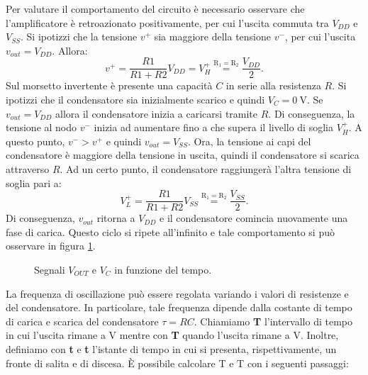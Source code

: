 \noindent
Per valutare il comportamento del circuito è necessario osservare che l'amplificatore è retroazionato positivamente, per cui l'uscita commuta tra $V_{DD}$ e $V_{SS}$. Si ipotizzi che la tensione $v^+$ sia maggiore della tensione $v^-$, per cui l'uscita $v_{out} = V_{DD}$. Allora:
\begin{equation}
	v^+ = \frac{R1}{R1+R2} V_{DD} = V_H^+\overset{\mathrm{R_1=R_2}}{=}\frac{V_{DD}}{2}.
\end{equation}
Sul morsetto invertente è presente una capacità $C$ in serie alla resistenza $R$. Si ipotizzi che il condensatore sia inizialmente scarico e quindi $V_C = \SI{0}{\volt}$. Se $v_{out} = V_{DD}$ allora il condensatore inizia a caricarsi tramite $R$. Di conseguenza, la tensione al nodo $v^-$ inizia ad aumentare fino a che supera il livello di soglia $V_H^+$. A questo punto, $v^- > v^+$ e quindi $v_{out} = V_{SS}$. Ora, la tensione ai capi del condensatore è maggiore della tensione in uscita, quindi il condensatore si scarica attraverso $R$. Ad un certo punto, il condensatore raggiungerà l'altra tensione di soglia pari a:
\begin{equation}
	V_L^+ = \frac{R1}{R1+R2} V_{SS}\overset{\mathrm{R_1=R_2}}{=}\frac{V_{SS}}{2}.
\end{equation}
Di conseguenza, $v_{out}$ ritorna a $V_{DD}$ e il condensatore comincia nuovamente una fase di carica. Questo ciclo si ripete all'infinito e tale comportamento si può osservare in figura \ref{fig:oscillatore}.

\begin{figure}[h!]
	\centering
	\caption{Segnali $V_{OUT}$ e $V_C$ in funzione del tempo.}
	\label{fig:oscillatore}
\end{figure}



La frequenza di oscillazione può essere regolata variando i valori di resistenze e del condensatore. In particolare, tale frequenza dipende dalla costante di tempo di carica e scarica del condensatore $\tau=RC$. Chiamiamo \textbf{T} l'intervallo di tempo in cui l'uscita rimane a V mentre con \textbf{T} quando l'uscita rimane a V. Inoltre, definiamo con \textbf{t} e \textbf{t} l'istante di tempo in cui si presenta, rispettivamente, un fronte di salita e di discesa. \`E possibile calcolare T e T con i seguenti passaggi:

